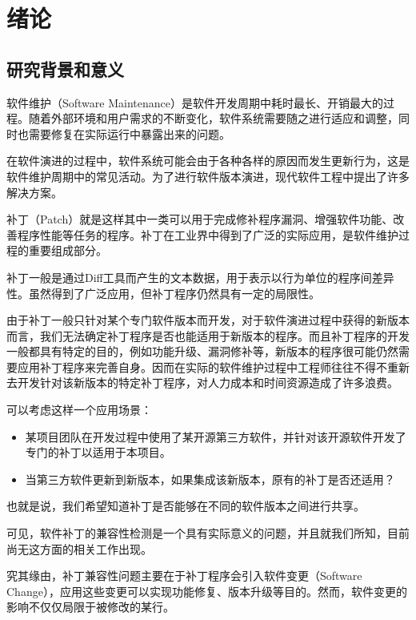 \chapter{绪论}
\section{研究背景和意义}

软件维护（Software Maintenance）是软件开发周期中耗时最长、开销最大的过程\cite{lehnert2011review}。随着外部环境和用户需求的不断变化，软件系统需要随之进行适应和调整，同时也需要修复在实际运行中暴露出来的问题。

在软件演进的过程中，软件系统可能会由于各种各样的原因而发生更新行为，这是软件维护周期中的常见活动\cite{pigoski1996practical}。为了进行软件版本演进，现代软件工程中提出了许多解决方案。

补丁（Patch）就是这样其中一类可以用于完成修补程序漏洞、增强软件功能、改善程序性能等任务的程序。补丁在工业界中得到了广泛的实际应用，是软件维护过程的重要组成部分\cite{le2014patch}。

补丁一般是通过Diff工具而产生的文本数据\cite{hunt1976algorithm}，用于表示以行为单位的程序间差异性。虽然得到了广泛应用，但补丁程序仍然具有一定的局限性。

由于补丁一般只针对某个专门软件版本而开发，对于软件演进过程中获得的新版本而言，我们无法确定补丁程序是否也能适用于新版本的程序。而且补丁程序的开发一般都具有特定的目的，例如功能升级、漏洞修补等，新版本的程序很可能仍然需要应用补丁程序来完善自身。因而在实际的软件维护过程中工程师往往不得不重新去开发针对该新版本的特定补丁程序，对人力成本和时间资源造成了许多浪费。

可以考虑这样一个应用场景：

\begin{itemize}
	\item 某项目团队在开发过程中使用了某开源第三方软件，并针对该开源软件开发了专门的补丁以适用于本项目。
	\item 当第三方软件更新到新版本，如果集成该新版本，原有的补丁是否还适用？
\end{itemize}

也就是说，我们希望知道补丁是否能够在不同的软件版本之间进行共享。

可见，软件补丁的兼容性检测是一个具有实际意义的问题，并且就我们所知，目前尚无这方面的相关工作出现。

究其缘由，补丁兼容性问题主要在于补丁程序会引入软件变更（Software Change）\cite{buckley2005towards}，应用这些变更可以实现功能修复、版本升级等目的。然而，软件变更的影响不仅仅局限于被修改的某行。

